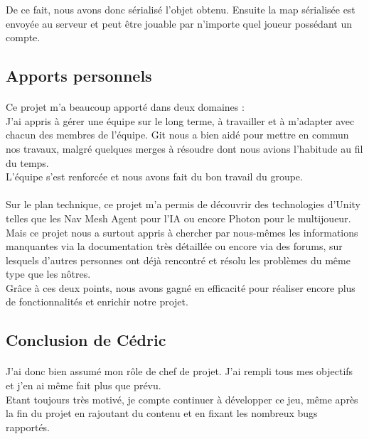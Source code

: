 \documentclass[titlepage, 13px, a4paper]{report}
\begin{document}
De ce fait, nous avons donc sérialisé l’objet obtenu. Ensuite la map sérialisée est envoyée au serveur et peut être 
jouable par n’importe quel joueur possédant un compte. \\


\subsection{Apports personnels}
\paragraph*{} \hspace{0pt}
Ce projet m’a beaucoup apporté dans deux domaines : \\
J’ai appris à gérer une équipe sur le long terme, à travailler et à m'adapter avec chacun des membres de l'équipe. 
Git nous a bien aidé pour mettre en commun nos travaux, malgré quelques merges à résoudre dont 
nous avions l’habitude au fil du temps. \\
L’équipe s’est renforcée et nous avons fait du bon travail du groupe. \\ 

\paragraph*{} \hspace{0pt}
Sur le plan technique, ce projet m’a permis de découvrir des technologies d’Unity telles que les Nav Mesh Agent 
pour l’IA ou encore Photon pour le multijoueur.
Mais ce projet nous a surtout appris à chercher par nous-mêmes les informations manquantes via la documentation 
très détaillée ou encore via des forums, sur lesquels d’autres personnes ont déjà rencontré 
et résolu les problèmes du même type que les nôtres. \\
Grâce à ces deux points, nous avons gagné en efficacité pour réaliser encore plus de fonctionnalités 
et enrichir notre projet. \\


\subsection{Conclusion de Cédric}
\paragraph*{} \hspace{0pt}
J’ai donc bien assumé mon rôle de chef de projet. J’ai rempli tous mes objectifs et 
j’en ai même fait plus que prévu. \\
Etant toujours très motivé, je compte continuer à développer ce jeu, même après la fin du projet en rajoutant du 
contenu et en fixant les nombreux bugs rapportés. \\
\end{document}
